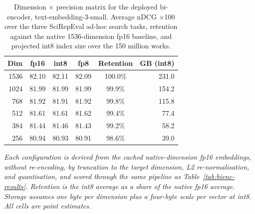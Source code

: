 \begin{table}[t]
\caption{Dimension $\times$ precision matrix for the deployed bi-encoder, text-embedding-3-small. Average nDCG $\times$100 over the three SciRepEval ad-hoc search tasks, retention against the native 1536-dimension fp16 baseline, and projected int8 index size over the 150 million works.}
\label{tab:quant-te3s}
\centering
\footnotesize
\begin{tabular}{@{}rccccr@{}}
\toprule
Dim & fp16 & int8 & fp8 & Retention & GB (int8) \\
\midrule
1536 & 82.10 & 82.11 & 82.09 & 100.0\% & 231.0 \\
1024 & 81.99 & 81.99 & 81.99 & 99.9\%  & 154.2 \\
768  & 81.92 & 81.91 & 81.92 & 99.8\%  & 115.8 \\
512  & 81.61 & 81.61 & 81.62 & 99.4\%  & 77.4  \\
384  & 81.44 & 81.46 & 81.43 & 99.2\%  & 58.2  \\
256  & 80.94 & 80.93 & 80.91 & 98.6\%  & 39.0  \\
\bottomrule
\end{tabular}

\vspace{3pt}
\begin{minipage}{\linewidth}
\footnotesize\itshape
Each configuration is derived from the cached native-dimension fp16 embeddings, without re-encoding, by truncation to the target dimension, L2 re-normalisation, and quantisation, and scored through the same pipeline as Table~\ref{tab:bienc-results}. Retention is the int8 average as a share of the native fp16 average. Storage assumes one byte per dimension plus a four-byte scale per vector at int8. All cells are point estimates.
\end{minipage}
\end{table}

